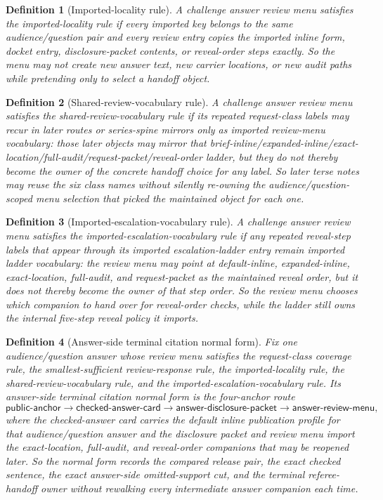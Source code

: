 \documentclass[11pt]{article}
\newtheorem{definition}{Definition}
\begin{document}
\begin{definition}[Imported-locality rule]
A challenge answer review menu satisfies the \emph{imported-locality rule} if every imported key belongs to the same audience/question pair and every review entry copies the imported inline form, docket entry, disclosure-packet contents, or reveal-order steps exactly.
So the menu may not create new answer text, new carrier locations, or new audit paths while pretending only to select a handoff object.
\end{definition}

\begin{definition}[Shared-review-vocabulary rule]
A challenge answer review menu satisfies the \emph{shared-review-vocabulary rule} if its repeated request-class labels may recur in later routes or series-spine mirrors only as imported review-menu vocabulary: those later objects may mirror that \textsf{brief-inline}/\textsf{expanded-inline}/\textsf{exact-location}/\textsf{full-audit}/\textsf{request-packet}/\textsf{reveal-order} ladder, but they do not thereby become the owner of the concrete handoff choice for any label.
So later terse notes may reuse the six class names without silently re-owning the audience/question-scoped menu selection that picked the maintained object for each one.
\end{definition}

\begin{definition}[Imported-escalation-vocabulary rule]
A challenge answer review menu satisfies the \emph{imported-escalation-vocabulary rule} if any repeated reveal-step labels that appear through its imported escalation-ladder entry remain imported ladder vocabulary: the review menu may point at \textsf{default-inline}, \textsf{expanded-inline}, \textsf{exact-location}, \textsf{full-audit}, and \textsf{request-packet} as the maintained reveal order, but it does not thereby become the owner of that step order.
So the review menu chooses which companion to hand over for \textsf{reveal-order} checks, while the ladder still owns the internal five-step reveal policy it imports.
\end{definition}


\begin{definition}[Answer-side terminal citation normal form]
Fix one audience/question answer whose review menu satisfies the request-class coverage rule, the smallest-sufficient review-response rule, the imported-locality rule, the shared-review-vocabulary rule, and the imported-escalation-vocabulary rule.
Its \emph{answer-side terminal citation normal form} is the four-anchor route
\[
\textsf{public-anchor} \to \textsf{checked-answer-card} \to \textsf{answer-disclosure-packet} \to \textsf{answer-review-menu},
\]
where the checked-answer card carries the default inline publication profile for that audience/question answer and the disclosure packet and review menu import the exact-location, full-audit, and reveal-order companions that may be reopened later.
So the normal form records the compared release pair, the exact checked sentence, the exact answer-side omitted-support cut, and the terminal referee-handoff owner without rewalking every intermediate answer companion each time.
\end{definition}
\end{document}
